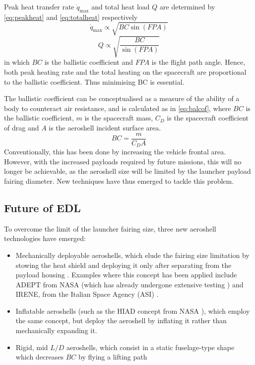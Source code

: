 Peak heat transfer rate $\dot{q}_{\max }$ and total heat load $Q$ are determined by \autoref{eq:peakheat} and \autoref{eq:totalheat} respectively
\begin{equation}
    \dot{q}_{\max } \propto \sqrt{B C \sin (FPA)}
    \label{eq:peakheat}
\end{equation}
\begin{equation}
    Q \propto \sqrt{\frac{B C}{\sin (FPA)}}
    \label{eq:totalheat}
\end{equation}
in which $BC$ is the ballistic coefficient and $FPA$ is the flight path angle.
Hence, both peak heating rate and the total heating on the spacecraft are proportional to the ballistic coefficient. Thus minimising BC is essential. 

The ballistic coefficient can be conceptualised as a measure of the ability of a body to counteract air resistance, and is calculated as in \autoref{eq:balcof}, where $BC$ is the ballistic coefficient, $m$ is the spacecraft mass, $C_D$ is the spacecraft coefficient of drag and $A$ is the aeroshell incident surface area.
\begin{equation}
    B C=\frac{m}{C_D A}
    \label{eq:balcof}
\end{equation}
Conventionally, this has been done by increasing the vehicle frontal area. However, with the increased payloads required by future missions, this will no longer be achievable, as the aeroshell size will be limited by the launcher payload fairing diameter. New techniques have thus emerged to tackle this problem.

\subsection{Future of EDL}
To overcome the limit of the launcher fairing size, three new aeroshell technologies have emerged:
\begin{itemize}
    \item Mechanically deployable aeroshells, which elude the fairing size limitation by stowing the heat shield and deploying it only after separating from the payload housing \cite{aerothermonotes}. Examples where this concept has been applied include ADEPT from NASA \cite{adeptfeasibility} (which has already undergone extensive testing \cite{adepttest}) and IRENE, from the Italian Space Agency (ASI) \cite{irene}.
    \item Inflatable aeroshells (such as the HIAD concept from NASA \cite{hiad}), which employ the same concept, but deploy the aeroshell by inflating it rather than mechanically expanding it. 
    \item Rigid, mid $L/D$ aeroshells, which consist in a static fuselage-type shape which decreases $BC$ by flying a lifting path \cite{aerothermonotes, midld}
\end{itemize}

